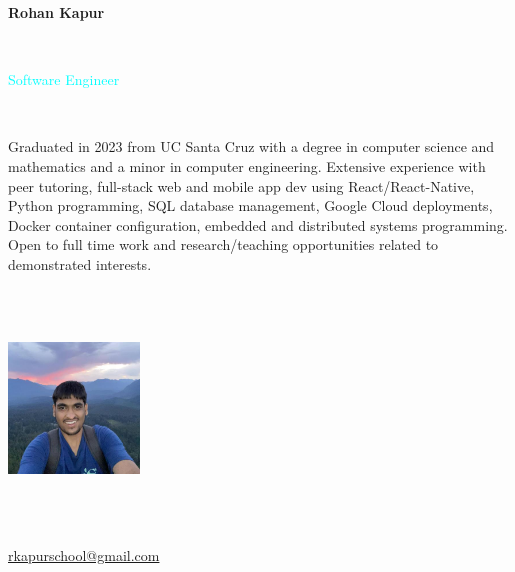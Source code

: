 \documentclass[letterpaper,10pt]{article}
\begin{document}
\fontsize{9pt}{\baselineskip}\selectfont

\begin{multicols}{3}
  \begin{huge} \noindent\textbf{Rohan Kapur} \end{huge} \\
  \begin{Large} \textcolor{cyan}{Software Engineer} \end{Large} 
  \vspace{.5em} \\
  \begin{minipage}{.5\textwidth}
    \begin{flushleft}
      Graduated in 2023 from UC Santa Cruz with a degree in computer science and mathematics and a minor in computer engineering. Extensive experience with peer tutoring, full-stack web and mobile app dev using React/React-Native, Python programming, SQL database management, Google Cloud deployments, Docker container configuration, embedded and distributed systems programming. Open to full time work and research/teaching opportunities related to demonstrated interests.
    \end{flushleft}
  \end{minipage}
  \columnbreak \\
  \vspace{3em} \\
  \begin{minipage}{.33\textwidth}
    \hspace{11.6em}
    \includegraphics*[width=3.5cm,height=3.5cm]{images/ProfilePicture.jpg}
  \end{minipage}
  \columnbreak \\
  \vspace{3em} \\
  \begin{minipage}{.33\textwidth}
    \begin{flushright}
      \faEnvelope\hspace{4px}\href{mailto:rkapurschool@gmail.com}{rkapurschool@gmail.com} \\

\end{flushright}
\end{minipage}
\end{multicols}
\end{document}
